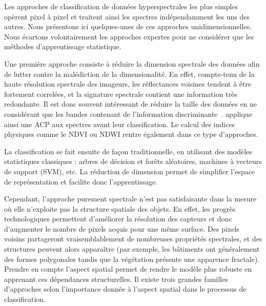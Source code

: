 Les approches de classification de données hyperspectrales les plus simples opèrent pixel à pixel et traitent ainsi les spectres indépendamment les uns des autres. Nous présentons ici quelques-unes de ces approches unidimensionnelles. Nous écartons volontairement les approches expertes pour ne considérer que les méthodes d'apprentissage statistique.

Une première approche consiste à réduire la dimension spectrale des données afin de lutter contre la malédiction de la dimensionalité. En effet, compte-tenu de la haute résolution spectrale des imageurs, les réflectances voisines tendent à être fortement correlées, et la signature spectrale contient une information très redondante. Il est donc souvent intéressant de réduire la taille des données en ne considérant que les bandes contenant de l'information discriminante~\cite{le_bris_extraction_2015,bevilacqua_unsupervised_2017}. \citet{rodarmel_principal_2002} applique ainsi une \gls{ACP} aux spectres avant leur classification. Le calcul des indices physiques comme le \gls{NDVI} ou \gls{NDWI} rentre également dans ce type d'approches.

La classification se fait ensuite de façon traditionnelle, en utilisant des modèles statistiques classiques : arbres de décision et forêts aléatoires, machines à vecteurs de support (SVM), etc. La réduction de dimension permet de simplifier l'espace de représentation et facilite donc l'apprentissage.

Cependant, l'approche purement spectrale n'est pas satisfaisante dans la mesure où elle n'exploite pas la structure spatiale des objets. En effet, les progrès technologiques permettent d'améliorer la résolution des capteurs et donc d'augmenter le nombre de pixels acquis pour une même surface. Des pixels voisins partageront vraisemblablement de nombreuses propriétés spectrales, et des structures peuvent alors apparaître (par exemple, les bâtiments ont généralement des formes polygonales tandis que la végétation présente une apparence fractale). Prendre en compte l'aspect spatial permet de rendre le modèle plus robuste en apprenant ces dépendances structurelles. Il existe trois grandes familles d'approches selon l'importance donnée à l'aspect spatial dans le processus de classification.


